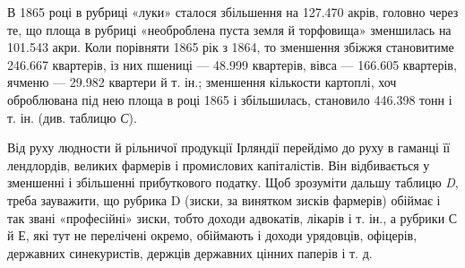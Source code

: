 \setlength{\tabcolsep}{\tabcolsepdef}

В 1865 році в рубриці «луки» сталося збільшення на 127.470 акрів,
головно через те, що площа в рубриці «необроблена пуста
земля й торфовища» зменшилась на 101.543 акри. Коли порівняти
1865 рік з 1864, то зменшення збіжжя становитиме 246.667
квартерів, із них пшениці — 48.999 квартерів, вівса — 166.605 квартерів,
ячменю — 29.982 квартери й т. ін.; зменшення кількости
картоплі, хоч оброблювана під нею площа в році 1865 і збільшилась,
становило 446.398 тонн і т. ін. (див. таблицю \emph{С}).

Від руху людности й рільничої продукції Ірляндії перейдімо
до руху в гаманці її лендлордів, великих фармерів і промислових
капіталістів. Він відбивається у зменшенні і збільшенні прибуткового
податку. Щоб зрозуміти дальшу таблицю \emph{D}, треба зауважити,
що рубрика D (зиски, за винятком зисків фармерів) обіймає
і так звані «професійні» зиски, тобто доходи адвокатів,
лікарів і т. ін., а рубрики С й Е, які тут не перелічені окремо,
обіймають і доходи урядовців, офіцерів, державних синекуристів,
держців державних цінних паперів і т. д.
